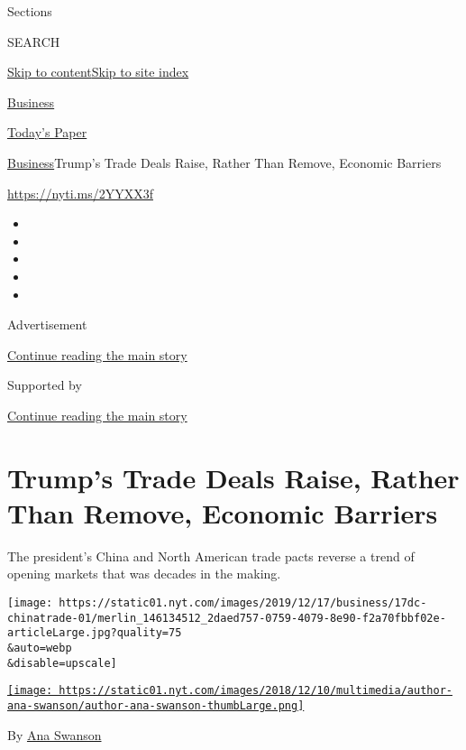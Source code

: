 Sections

SEARCH

\protect\hyperlink{site-content}{Skip to
content}\protect\hyperlink{site-index}{Skip to site index}

\href{https://www.nytimes.com/section/business}{Business}

\href{https://myaccount.nytimes.com/auth/login?response_type=cookie\&client_id=vi}{}

\href{https://www.nytimes.com/section/todayspaper}{Today's Paper}

\href{/section/business}{Business}\textbar{}Trump's Trade Deals Raise,
Rather Than Remove, Economic Barriers

\url{https://nyti.ms/2YYXX3f}

\begin{itemize}
\item
\item
\item
\item
\item
\end{itemize}

Advertisement

\protect\hyperlink{after-top}{Continue reading the main story}

Supported by

\protect\hyperlink{after-sponsor}{Continue reading the main story}

\hypertarget{trumps-trade-deals-raise-rather-than-remove-economic-barriers}{%
\section{Trump's Trade Deals Raise, Rather Than Remove, Economic
Barriers}\label{trumps-trade-deals-raise-rather-than-remove-economic-barriers}}

The president's China and North American trade pacts reverse a trend of
opening markets that was decades in the making.

\texttt{[image: https://static01.nyt.com/images/2019/12/17/business/17dc-chinatrade-01/merlin\_146134512\_2daed757-0759-4079-8e90-f2a70fbbf02e-articleLarge.jpg?quality=75\\\&auto=webp\\\&disable=upscale]}

\href{https://www.nytimes.com/by/ana-swanson}{\texttt{[image: https://static01.nyt.com/images/2018/12/10/multimedia/author-ana-swanson/author-ana-swanson-thumbLarge.png]}}

By \href{https://www.nytimes.com/by/ana-swanson}{Ana Swanson}

